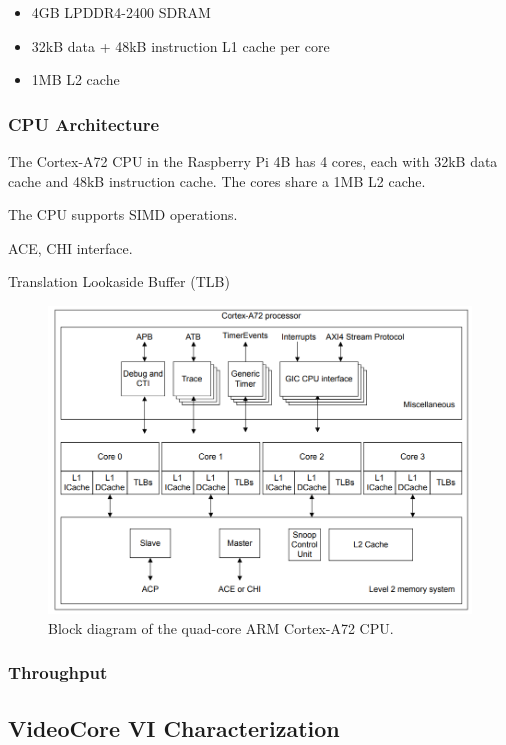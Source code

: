 \documentclass[12pt]{article}
\begin{document}
\begin{itemize}
\item 4GB LPDDR4-2400 SDRAM
\item 32kB data + 48kB instruction L1 cache per core
\item 1MB L2 cache
\end{itemize}

\subsubsection{CPU Architecture}

The Cortex-A72 CPU in the Raspberry Pi 4B has 4 cores, each with 32kB data cache and 48kB instruction cache. The cores share a 1MB L2 cache.

The CPU supports SIMD operations.

ACE, CHI interface.

Translation Lookaside Buffer (TLB)

\begin{figure}[h]
\centering
\includegraphics[width=1.0\textwidth]{A72_Core_Diagram.png} %
\caption{Block diagram of the quad-core ARM Cortex-A72 CPU.}
\label{fig:A72_arch}
\end{figure}

\subsubsection{Throughput}

\subsection{VideoCore VI Characterization}
\end{document}
